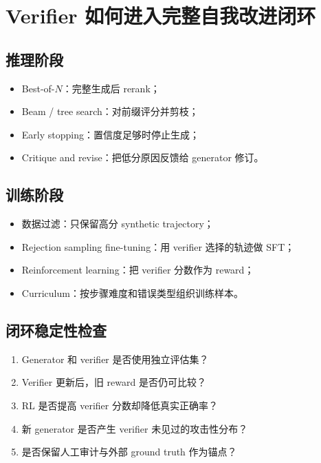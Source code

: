 \section{Verifier 如何进入完整自我改进闭环}

\subsection{推理阶段}

\begin{itemize}
    \item Best-of-$N$：完整生成后 rerank；
    \item Beam / tree search：对前缀评分并剪枝；
    \item Early stopping：置信度足够时停止生成；
    \item Critique and revise：把低分原因反馈给 generator 修订。
\end{itemize}

\subsection{训练阶段}

\begin{itemize}
    \item 数据过滤：只保留高分 synthetic trajectory；
    \item Rejection sampling fine-tuning：用 verifier 选择的轨迹做 SFT；
    \item Reinforcement learning：把 verifier 分数作为 reward；
    \item Curriculum：按步骤难度和错误类型组织训练样本。
\end{itemize}

\subsection{闭环稳定性检查}

\begin{enumerate}
    \item Generator 和 verifier 是否使用独立评估集？
    \item Verifier 更新后，旧 reward 是否仍可比较？
    \item RL 是否提高 verifier 分数却降低真实正确率？
    \item 新 generator 是否产生 verifier 未见过的攻击性分布？
    \item 是否保留人工审计与外部 ground truth 作为锚点？
\end{enumerate}

